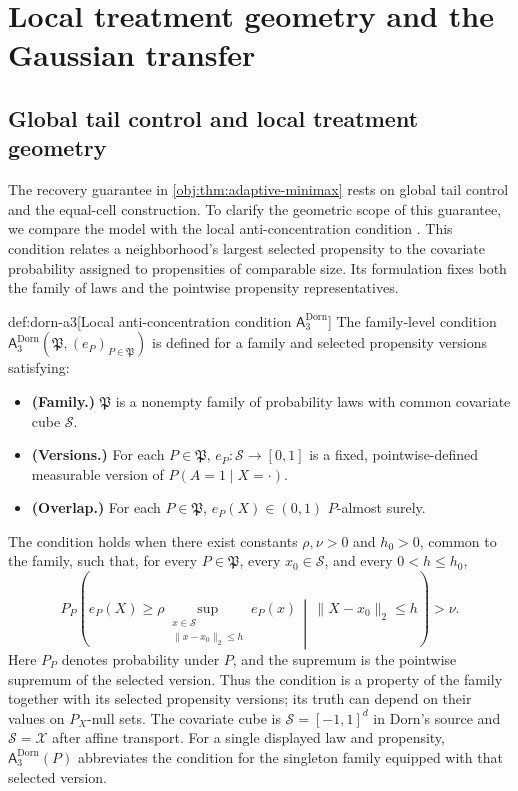 \section{Local treatment geometry and the Gaussian transfer}

\subsection{Global tail control and local treatment geometry}

The recovery guarantee in \cref{obj:thm:adaptive-minimax} rests on global tail control and the equal-cell construction. To clarify the geometric scope of this guarantee, we compare the model with the local anti-concentration condition . This condition relates a neighborhood's largest selected propensity to the covariate probability assigned to propensities of comparable size. Its formulation fixes both the family of laws and the pointwise propensity representatives.

\begin{definitionv}{def:dorn-a3}[Local anti-concentration condition $\mathsf A_3^{\mathrm{Dorn}}$]
The family-level condition
\(\mathsf A_3^{\mathrm{Dorn}}(\mathfrak P,(e_P)_{P\in\mathfrak P})\)
is defined for a family and selected propensity versions satisfying:
\begin{itemize}
\item \textbf{(Family.)} \(\mathfrak P\) is a nonempty family of probability laws with common covariate cube \(\mathcal S\).
\item \textbf{(Versions.)} For each \(P\in\mathfrak P\), \(e_P:\mathcal S\to[0,1]\) is a fixed, pointwise-defined measurable version of \(P(A=1\mid X=\cdot)\).
\item \textbf{(Overlap.)} For each \(P\in\mathfrak P\), \(e_P(X)\in(0,1)\) \(P\)-almost surely.
\end{itemize}
The condition holds when there exist constants \(\rho,\nu>0\) and \(h_0>0\), common to the family, such that, for every \(P\in\mathfrak P\), every \(x_0\in\mathcal S\), and every \(0<h\le h_0\),
\[
P_P\left(
e_P(X)\ge
\rho\sup_{\substack{x\in\mathcal S\\\|x-x_0\|_2\le h}}e_P(x)
\,\middle|\,
\|X-x_0\|_2\le h
\right)>\nu.
\]
Here \(P_P\) denotes probability under \(P\), and the supremum is the pointwise supremum of the selected version. Thus the condition is a property of the family together with its selected propensity versions; its truth can depend on their values on \(P_X\)-null sets. The covariate cube is \(\mathcal S=[-1,1]^d\) in Dorn's source and \(\mathcal S=\mathcal X\) after affine transport. For a single displayed law and propensity, \(\mathsf A_3^{\mathrm{Dorn}}(P)\) abbreviates the condition for the singleton family equipped with that selected version.
\end{definitionv}

